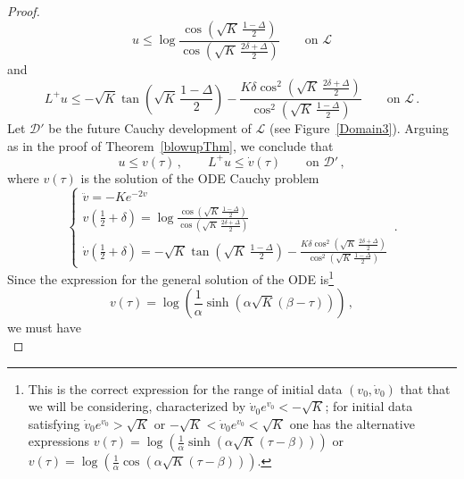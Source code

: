\documentclass[10pt]{amsart}
\begin{document}
\begin{proof}
\begin{equation} 
u \leq \log \frac{\cos \left( \sqrt{K} \, \frac{1 - \Delta}2 \right)}{\cos \left( \sqrt{K} \, \frac{2\delta + \Delta}2 \right)} \qquad \text{on } \mathcal{L}
\end{equation}
and
\begin{equation} 
L^+ u \leq - \sqrt{K} \tan \left( \sqrt{K} \, \frac{1 - \Delta}2 \right) - \frac{K \delta\cos^2 \left( \sqrt{K} \, \frac{2\delta + \Delta}2 \right)}{\cos^2 \left( \sqrt{K} \, \frac{1 - \Delta}2 \right)} \qquad \text{on } \mathcal{L} \, .
\end{equation}
Let $\mathcal{D}'$ be the future Cauchy development of $\mathcal{L}$ (see Figure~\ref{Domain3}). Arguing as in the proof of Theorem~\ref{blowupThm}, we conclude that
\begin{equation} \label{arguing}
u \leq v(\tau) \, , \qquad L^+ u \leq \dot{v}(\tau) \qquad \text{on } \mathcal{D}' \, ,
\end{equation}
where $v(\tau)$ is the solution of the ODE Cauchy problem
\begin{equation}
\begin{cases}
\ddot{v} = - K e^{- 2v} \\
v(\frac12 + \delta)= \log \frac{\cos \left( \sqrt{K} \, \frac{1 - \Delta}2 \right)}{\cos \left( \sqrt{K} \, \frac{2\delta + \Delta}2 \right)} \\
\dot{v}(\frac12 + \delta)= - \sqrt{K} \tan \left( \sqrt{K} \, \frac{1 - \Delta}2 \right) - \frac{K \delta\cos^2 \left( \sqrt{K} \, \frac{2\delta + \Delta}2 \right)}{\cos^2 \left( \sqrt{K} \, \frac{1 - \Delta}2 \right)}
\end{cases} \, .
\end{equation}
Since the expression for the general solution of the ODE is\footnote{This is the correct expression for the range of initial data $(v_0,\dot{v}_0)$ that that we will be considering, characterized by $\dot{v}_0e^{v_0}<-\sqrt{K}$; for initial data satisfying $\dot{v}_0e^{v_0}>\sqrt{K}$ or $-\sqrt{K}<\dot{v}_0e^{v_0}<\sqrt{K}$ one has the alternative expressions $v(\tau) = \log \left(\frac1{\alpha}\sinh \left( \alpha\sqrt{K} (\tau - \beta) \right)\right)$ or $v(\tau) = \log \left(\frac1{\alpha}\cos \left( \alpha\sqrt{K} (\tau - \beta) \right)\right)$.}
\begin{equation} \label{solutionODE}
v(\tau) = \log \left(\frac1{\alpha}\sinh \left( \alpha\sqrt{K} (\beta - \tau) \right)\right) \, ,
\end{equation}
we must have
\begin{equation} \label{nonlinearsys}

\end{equation}
\end{proof}
\end{document}
